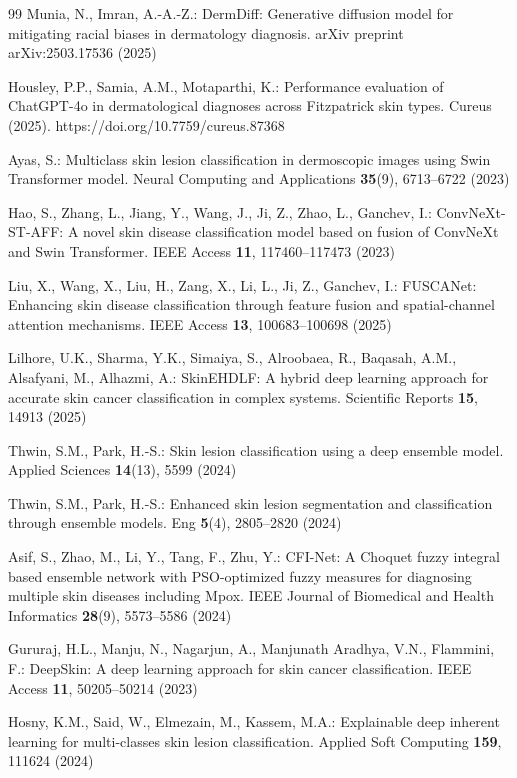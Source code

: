 \documentclass[pdflatex,sn-mathphys-num]{sn-jnl}%
\begin{document}
\begin{thebibliography}{99}
Munia, N., Imran, A.-A.-Z.: DermDiff: Generative diffusion model for mitigating racial biases
in dermatology diagnosis. arXiv preprint arXiv:2503.17536 (2025)

Housley, P.P., Samia, A.M., Motaparthi, K.: Performance evaluation of ChatGPT-4o in
dermatological diagnoses across Fitzpatrick skin types. Cureus (2025).
https://doi.org/10.7759/cureus.87368

Ayas, S.: Multiclass skin lesion classification in dermoscopic images using Swin Transformer
model. Neural Computing and Applications \textbf{35}(9), 6713--6722 (2023)

Hao, S., Zhang, L., Jiang, Y., Wang, J., Ji, Z., Zhao, L., Ganchev, I.: ConvNeXt-ST-AFF: A
novel skin disease classification model based on fusion of ConvNeXt and Swin Transformer.
IEEE Access \textbf{11}, 117460--117473 (2023)

Liu, X., Wang, X., Liu, H., Zang, X., Li, L., Ji, Z., Ganchev, I.: FUSCANet: Enhancing skin
disease classification through feature fusion and spatial-channel attention mechanisms. IEEE
Access \textbf{13}, 100683--100698 (2025)

Lilhore, U.K., Sharma, Y.K., Simaiya, S., Alroobaea, R., Baqasah, A.M., Alsafyani, M.,
Alhazmi, A.: SkinEHDLF: A hybrid deep learning approach for accurate skin cancer
classification in complex systems. Scientific Reports \textbf{15}, 14913 (2025)

Thwin, S.M., Park, H.-S.: Skin lesion classification using a deep ensemble model. Applied
Sciences \textbf{14}(13), 5599 (2024)

Thwin, S.M., Park, H.-S.: Enhanced skin lesion segmentation and classification through
ensemble models. Eng \textbf{5}(4), 2805--2820 (2024)

Asif, S., Zhao, M., Li, Y., Tang, F., Zhu, Y.: CFI-Net: A Choquet fuzzy integral based
ensemble network with PSO-optimized fuzzy measures for diagnosing multiple skin diseases
including Mpox. IEEE Journal of Biomedical and Health Informatics \textbf{28}(9), 5573--5586
(2024)

Gururaj, H.L., Manju, N., Nagarjun, A., Manjunath Aradhya, V.N., Flammini, F.: DeepSkin: A
deep learning approach for skin cancer classification. IEEE Access \textbf{11}, 50205--50214
(2023)

Hosny, K.M., Said, W., Elmezain, M., Kassem, M.A.: Explainable deep inherent learning for
multi-classes skin lesion classification. Applied Soft Computing \textbf{159}, 111624 (2024)


\end{thebibliography}
\end{document}
